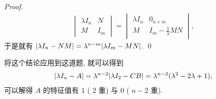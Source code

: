 \begin{exercise}[series=exer]
\begin{answer}
\begin{proof}
\begin{align*}
              \begin{vmatrix}
                  \lambda I_{n} & N \\ M & I_{m}
              \end{vmatrix}
              =
              \begin{vmatrix}
                  \lambda I_{n} & 0_{n \times m} \\ M & I_{m} - \frac{1}{\lambda} MN
              \end{vmatrix},
          \end{align*}
          于是就有 $ \abs{\lambda I_{n} - NM} = \lambda^{n - m}\abs{\lambda I_{m} - MN} $. \qed
      \end{proof}

      将这个结论应用到这道题, 就可以得到
      \begin{align*}
          \abs{\lambda I_{n} - A} = \lambda^{n - 2}\abs{\lambda I_{2} - CB} = \lambda^{n - 2}(\lambda^{2} - 2\lambda + 1),
      \end{align*}
      可以解得 $ A $ 的特征值有 $ 1 $ ( $ 2 $ 重) 与 $ 0 $ ( $ n - 2 $ 重).


\end{answer}
\end{exercise}
